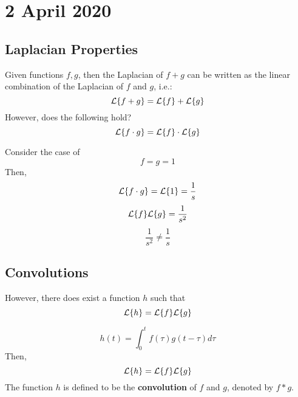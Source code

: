 \documentclass[diffeq.tex]{subfiles}
\begin{document}
\chapter{2 April 2020}
    \section{Laplacian Properties}
    Given functions $f, g$, then the Laplacian of $f + g$ can be written as the linear combination of the Laplacian of $f$ and $g$, i.e.:
    \begin{equation}
        \mathcal{L}\{f + g\} = \mathcal{L}\{f\} + \mathcal{L}\{g\}
    \end{equation}
    However, does the following hold?
    \begin{equation}
        \mathcal{L}\{f \cdot g\} = \mathcal{L}\{f\} \cdot \mathcal{L}\{g\}
    \end{equation}
    \begin{example}
        Consider the case of
        \begin{equation}
            f = g = 1
        \end{equation}
        Then,
        \begin{equation}
            \mathcal{L}\{f \cdot g\} = \mathcal{L}\{1\} = \frac{1}{s}
        \end{equation}
        \begin{equation}
            \mathcal{L}\{f\}\mathcal{L}\{g\} = \frac{1}{s^{2}}
        \end{equation}
        \begin{equation}
            \frac{1}{s^{2}} \neq \frac{1}{s}
        \end{equation}
    \end{example}
    \np
    \section{Convolutions}
    However, there does exist a function $h$ such that
    \begin{equation}
        \mathcal{L}\{h\} = \mathcal{L}\{f\}\mathcal{L}\{g\}
    \end{equation}
    \begin{btheorem}
        \begin{equation}
            h(t) = \int_{0}^{t}f(\tau)g(t - \tau)d\tau
        \end{equation}
        Then,
        \begin{equation}
            \mathcal{L}\{h\} = \mathcal{L}\{f\}\mathcal{L}\{g\}
        \end{equation}
        The function $h$ is defined to be the \textbf{convolution} of $f$ and $g$, denoted by $f * g$.
    \end{btheorem}
\end{document}
